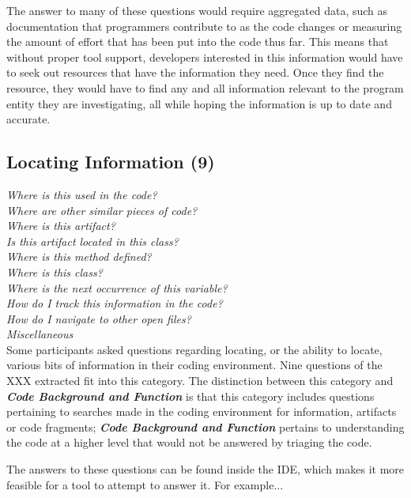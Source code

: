 \documentclass[conference]{IEEEtran}
\begin{document}
The answer to many of these questions would require aggregated data, such as documentation that programmers contribute to as the code changes or measuring the amount of effort that has been put into the code thus far.
This means that without proper tool support, developers interested in this information would have to seek out resources that have the information they need. Once they find the resource, they would have to find any and all information relevant to the program entity they are investigating, all while hoping the information is up to date and accurate. 



\noindent\subsection{\textbf{Locating Information (9)}}

\noindent\emph{Where is this used in the code?} \\
\emph{Where are other similar pieces of code?} \\
\emph{Where is this artifact?} \\
\emph{Is this artifact located in this class?} \\
\emph{Where is this method defined?} \\
\emph{Where is this class? } \\
\emph{Where is the next occurrence of this variable?} \\
\emph{How do I track this information in the code?} \\
\emph{How do I navigate to other open files?} \\
\emph{Miscellaneous} \\

Some participants asked questions regarding locating, or the ability to locate, various bits of information in their coding environment. Nine questions of the XXX extracted fit into this category. The distinction between this category and \emph{\textbf{Code Background and Function}} is that this category includes questions pertaining to searches made in the coding environment for information, artifacts or code fragments; \emph{\textbf{Code Background and Function}} pertains to understanding the code at a higher level that would not be answered by triaging the code.

The answers to these questions can be found inside the IDE, which makes it more feasible for a tool to attempt to answer it. For example... 
\end{document}
